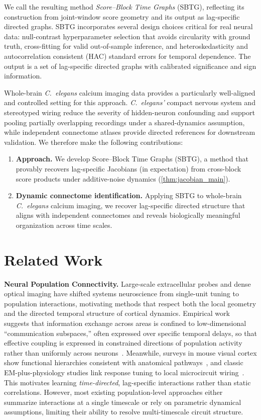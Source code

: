 \documentclass{article}
\theoremstyle{plain}
\theoremstyle{definition}
\theoremstyle{remark}
\newcommand{\1}{\mathbf{1}}
\begin{document}
We call the resulting method \emph{Score--Block Time Graphs} (SBTG), reflecting its construction from joint-window score geometry and its output as lag-specific directed graphs. SBTG incorporates several design choices critical for real neural data: null-contrast hyperparameter selection that avoids circularity with ground truth, cross-fitting for valid out-of-sample inference, and heteroskedasticity and autocorrelation consistent (HAC) standard errors for temporal dependence. The output is a set of lag-specific directed graphs with calibrated significance and sign information.

Whole-brain \emph{C.~elegans} calcium imaging data provides a particularly well-aligned and controlled setting for this approach. \emph{C.~elegans'} compact nervous system and stereotyped wiring reduce the severity of hidden-neuron confounding and support pooling partially overlapping recordings under a shared-dynamics assumption, while independent connectome atlases provide directed references for downstream validation. We therefore make the following contributions:
\vspace{-1mm}
\begin{enumerate}[leftmargin=1.2em]
  \item \textbf{Approach.} We develop Score--Block Time Graphs (SBTG), a method that provably recovers lag-specific Jacobians (in expectation) from cross-block score products under additive-noise dynamics (\cref{thm:jacobian_main}). 
  \item \textbf{Dynamic connectome identification.} Applying SBTG to whole-brain \emph{C.~elegans} calcium imaging, we recover lag-specific directed structure that aligns with independent connectomes and reveals biologically meaningful organization across time scales.
\end{enumerate}

\section{Related Work}

\textbf{Neural Population Connectivity.} Large-scale extracellular probes and dense optical imaging have shifted systems neuroscience from single-unit tuning to population interactions, motivating methods that respect both the local geometry and the directed temporal structure of cortical dynamics. Empirical work suggests that information exchange across areas is confined to low-dimensional ``communication subspaces,'' often expressed over specific temporal delays, so that effective coupling is expressed in constrained directions of population activity rather than uniformly across neurons~\citep{Semedo2019}. Meanwhile, surveys in mouse visual cortex show functional hierarchies consistent with anatomical pathways~\citep{Siegle2021}, and classic EM-plus-physiology studies link response tuning to local microcircuit wiring~\citep{Bock2011}. This motivates learning \emph{time-directed}, lag-specific interactions rather than static correlations. However, most existing population-level approaches either summarize interactions at a single timescale or rely on parametric dynamical assumptions, limiting their ability to resolve multi-timescale circuit structure.
\end{document}
